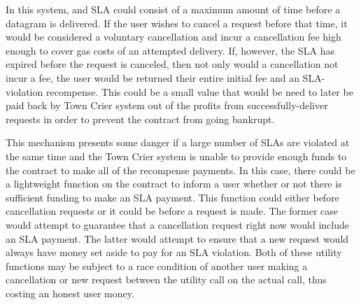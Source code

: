In this system, and SLA could consist of a maximum amount of time before a datagram is delivered.
If the user wishes to cancel a request before that time, it would be considered a voluntary cancellation and incur a cancellation fee high enough to cover gas costs of an attempted delivery.
If, however, the SLA has expired before the request is canceled, then not only would a cancellation not incur a fee, the user would be returned their entire initial fee and an SLA-violation recompense.
This could be a small value that would be need to later be paid back by Town Crier system out of the profits from successfully-deliver requests in order to prevent the contract from going bankrupt.

This mechanism presents some danger if a large number of SLAs are violated at the same time and the Town Crier system is unable to provide enough funds to the contract to make all of the recompense payments.
In this case, there could be a lightweight function on the contract to inform a user whether or not there is sufficient funding to make an SLA payment.
This function could either before cancellation requests or it could be before a request is made.
The former case would attempt to guarantee that a cancellation request right now would include an SLA payment.
The latter would attempt to ensure that a new request would always have money set aside to pay for an SLA violation.
Both of these utility functions may be subject to a race condition of another user making a cancellation or new request between the utility call on the actual call, thus costing an honest user money.






